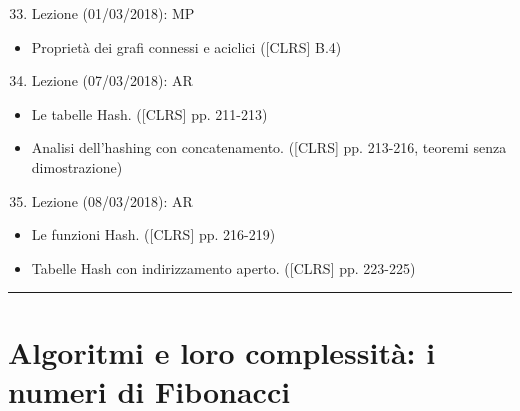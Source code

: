 \documentclass{article}
\providecommand{\tightlist}{%
  \setlength{\itemsep}{0pt}\setlength{\parskip}{0pt}}
\begin{document}
\begin{enumerate}
\setcounter{enumi}{32}
\tightlist
\item
  {Lezione (01/03/2018): MP}
\end{enumerate}

\begin{itemize}
\tightlist
\item
  {Proprietà dei grafi connessi e aciclici ({[}CLRS{]} B.4)}
\end{itemize}

\begin{enumerate}
\setcounter{enumi}{33}
\tightlist
\item
  {Lezione (07/03/2018): AR}
\end{enumerate}

\begin{itemize}
\tightlist
\item
  {Le tabelle Hash. ({[}CLRS{]} pp. 211-213)}
\item
  {Analisi dell'hashing con concatenamento. ({[}CLRS{]} pp. 213-216,
  teoremi senza dimostrazione)\\
  }
\end{itemize}

\begin{enumerate}
\setcounter{enumi}{34}
\tightlist
\item
  {Lezione (08/03/2018): AR}
\end{enumerate}

\begin{itemize}
\tightlist
\item
  {Le funzioni Hash. ({[}CLRS{]} pp. 216-219)}
\end{itemize}

\begin{itemize}
\tightlist
\item
  {Tabelle Hash con indirizzamento aperto. ({[}CLRS{]} pp. 223-225)}
\end{itemize}

\begin{center}\rule{0.5\linewidth}{\linethickness}\end{center}

\section{\texorpdfstring{{}}{}}\label{h.yttge93miuso}

\hypertarget{h.erye91slvrba}{\section{\texorpdfstring{{Algoritmi e loro
complessità: i numeri di Fibonacci
}}{Algoritmi e loro complessità: i numeri di Fibonacci }}\label{h.erye91slvrba}}
\end{document}

